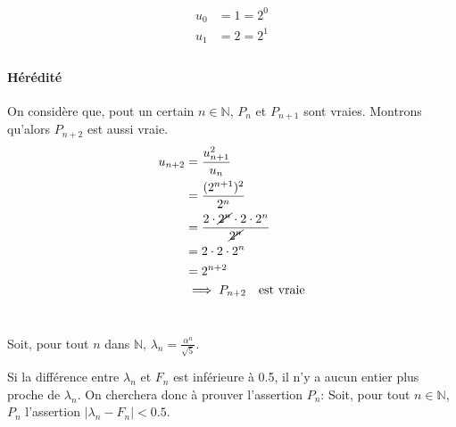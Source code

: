 \documentclass{article}
\newcommand{\N}{\mathds{N}}
\begin{document}
\begin{align*}
	u_0 &= 1 = 2^{0}  \\
	u_1&= 2 = 2^{1} \\
\end{align*}

\paragraph{Hérédité} On considère que, pout un certain $n \in \N$, $P_{n}$ et $P_{n+1}$ sont vraies. Montrons qu'alors $P_{n+2}$ est aussi vraie.
\begin{align*}
	u_{n+2} &= \frac{u_{n+1}^2}{u_n} \\
		&= \frac{(2^{n+1})^2}{2^{n}} \\
		&= \frac{2 \cdot \cancel{2^n} \cdot 2 \cdot 2^{n}}{\cancel{2^{n}}} \\
		&= 2 \cdot 2 \cdot 2^{n} \\
		&= 2^{n+2} \\
		&\implies P_{n+2}\quad\text{est vraie}
\end{align*}

\section{} %
\section{} %

Soit, pour tout $n$ dans $\N$, $\lambda_n = \frac{\alpha^{n}}{\sqrt{5} }$.

Si la différence entre $\lambda_n$ et $F_n$ est inférieure à 0.5, il n'y a aucun entier plus proche de $\lambda_n$.
On cherchera donc à prouver l'assertion $P_n$: Soit, pour tout $n \in \N$, $P_n$ l'assertion $|\lambda_n-F_n|<0.5$.

% 
% 
% 
\end{document}
